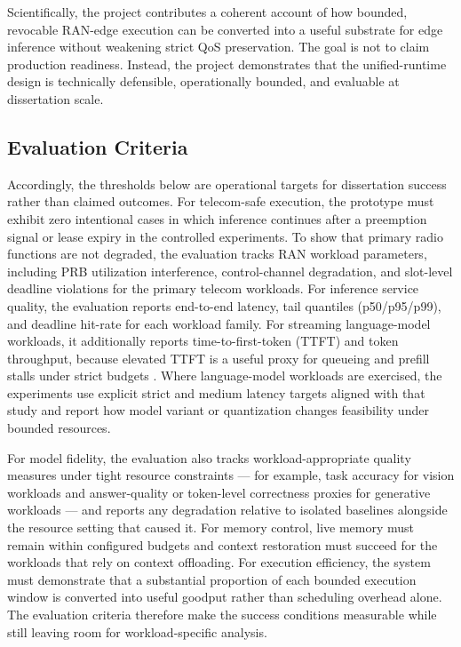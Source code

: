 \documentclass[a4paper,11pt]{article}
\begin{document}
Scientifically, the project contributes a coherent account of how bounded, revocable RAN-edge execution can be converted into a useful substrate for edge inference without weakening strict QoS preservation. The goal is not to claim production readiness. Instead, the project demonstrates that the unified-runtime design is technically defensible, operationally bounded, and evaluable at dissertation scale.

\subsection{Evaluation Criteria}

Accordingly, the thresholds below are operational targets for dissertation success rather than claimed outcomes. For telecom-safe execution, the prototype must exhibit zero intentional cases in which inference continues after a preemption signal or lease expiry in the controlled experiments. To show that primary radio functions are not degraded, the evaluation tracks RAN workload parameters, including PRB utilization interference, control-channel degradation, and slot-level deadline violations for the primary telecom workloads. For inference service quality, the evaluation reports end-to-end latency, tail quantiles (p50/p95/p99), and deadline hit-rate for each workload family. For streaming language-model workloads, it additionally reports time-to-first-token (TTFT) and token throughput, because elevated TTFT is a useful proxy for queueing and prefill stalls under strict budgets \cite{slaairan}. Where language-model workloads are exercised, the experiments use explicit strict and medium latency targets aligned with that study and report how model variant or quantization changes feasibility under bounded resources.

For model fidelity, the evaluation also tracks workload-appropriate quality measures under tight resource constraints --- for example, task accuracy for vision workloads and answer-quality or token-level correctness proxies for generative workloads --- and reports any degradation relative to isolated baselines alongside the resource setting that caused it. For memory control, live memory must remain within configured budgets and context restoration must succeed for the workloads that rely on context offloading. For execution efficiency, the system must demonstrate that a substantial proportion of each bounded execution window is converted into useful goodput rather than scheduling overhead alone. The evaluation criteria therefore make the success conditions measurable while still leaving room for workload-specific analysis.
\end{document}
